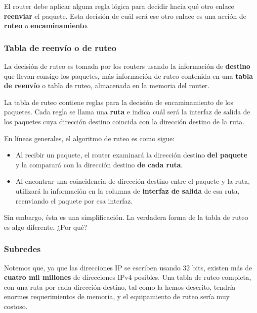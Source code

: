 \documentclass[spanish,a4paper,]{article}
\providecommand{\tightlist}{%
  \setlength{\itemsep}{0pt}\setlength{\parskip}{0pt}}
\begin{document}
El router debe aplicar alguna regla lógica para decidir hacia qué otro
enlace \textbf{reenviar} el paquete. Esta decisión de cuál será ese otro
enlace es una acción de \textbf{ruteo} o \textbf{encaminamiento}.

\hypertarget{tabla-de-reenvuxedo-o-de-ruteo}{%
\subsubsection{Tabla de reenvío o de
ruteo}\label{tabla-de-reenvuxedo-o-de-ruteo}}

La decisión de ruteo es tomada por los routers usando la información de
\textbf{destino} que llevan consigo los paquetes, más información de
ruteo contenida en una \textbf{tabla de reenvío} o tabla de ruteo,
almacenada en la memoria del router.

La tabla de ruteo contiene reglas para la decisión de encaminamiento de
los paquetes. Cada regla se llama una \textbf{ruta} e indica cuál será
la interfaz de salida de los paquetes cuya dirección destino coincida
con la dirección destino de la ruta.

En líneas generales, el algoritmo de ruteo es como sigue:

\begin{itemize}
\tightlist
\item
  Al recibir un paquete, el router examinará la dirección destino
  \textbf{del paquete} y la comparará con la dirección destino
  \textbf{de cada ruta}.
\item
  Al encontrar una coincidencia de dirección destino entre el paquete y
  la ruta, utilizará la información en la columna de \textbf{interfaz de
  salida} de esa ruta, reenviando el paquete por esa interfaz.
\end{itemize}

Sin embargo, ésta es una simplificación. La verdadera forma de la tabla
de ruteo es algo diferente. ¿Por qué?

\hypertarget{subredes}{%
\subsubsection{Subredes}\label{subredes}}

Notemos que, ya que las direcciones IP se escriben usando 32 bits,
existen más de \textbf{cuatro mil millones} de direcciones IPv4
posibles. Una tabla de ruteo completa, con una ruta por cada dirección
destino, tal como la hemos descrito, tendría enormes requerimientos de
memoria, y el equipamiento de ruteo sería muy costoso.
\end{document}
